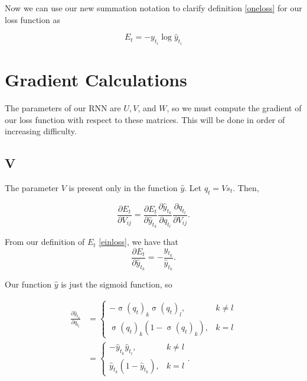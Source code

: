 \documentclass[11pt,twoside]{article}
\DeclareMathOperator{\sigmoid}{\sigma}
\begin{document}
\noindent Now we can use our new summation notation to clarify definition \eqref{oneloss} for our loss function as

\begin{equation}
\label{einloss}
E_t=-y_{t_i}\log{\hat{y}_{t_i}}
\end{equation}

\section{Gradient Calculations}
The parameters of our RNN are $U, V$, and $W$, so we must compute the gradient of our loss function with respect to these matrices. This will be done in order of increasing difficulty.

\subsection{V}
The parameter $V$ is present only in the function $\hat{y}$. Let $q_t=V s_t$. Then,

\begin{equation}
\frac{\partial E_t}{\partial V_{i j}}=\frac{\partial E_t}{\partial \hat{y}_{t_k}}\frac{\partial \hat{y}_{t_k}}{\partial q_{t_l}}\frac{\partial q_{t_l}}{\partial  V_{i j}}.
\end{equation}

\noindent From our definition of $E_t$ \eqref{einloss}, we have that 
\begin{equation}
\label{e8}
\frac{\partial E_t}{\partial \hat{y}_{t_k}}=-\frac{y_{t_k}}{\hat{y}_{t_k}}.
\end{equation}

\noindent Our function $\hat{y}$ is just the sigmoid function, so

\begin{subequations}
\begin{align}
\frac{\partial \hat{y}_{t_k}}{\partial q_{t_l}}&=\left\{
	\begin{array}{lr}
	-\sigmoid(q_t)_k\sigmoid(q_t)_l, & k\neq l \\
	\sigmoid(q_t)_k\left(1-\sigmoid(q_t)_k\right), & k=l
	\end{array}
	\right. \\
\label{e9}
&=\left\{
	\begin{array}{lr}
	-\hat{y}_{t_k}\hat{y}_{t_l}, & k\neq l \\
	\hat{y}_{t_k}\left(1-\hat{y}_{t_k}\right), & k=l
	\end{array}
	\right..
\end{align}
\end{subequations}
\end{document}
